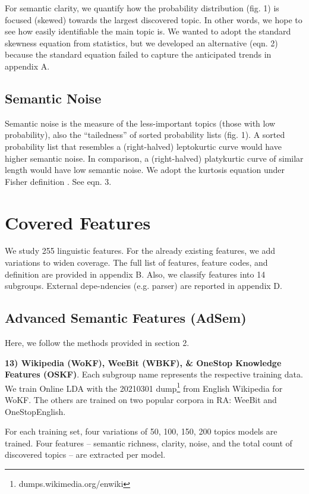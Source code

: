 \documentclass[11pt]{article}
\begin{document}
For semantic clarity, we quantify how the probability distribution (fig. 1) is focused (skewed) towards the largest discovered topic. In other words, we hope to see how easily identifiable the main topic is. We wanted to adopt the standard skewness equation from statistics, but we developed an alternative (eqn. 2) because the standard equation failed to capture the anticipated trends in appendix A.



\subsection{Semantic Noise}
Semantic noise is the measure of the less-important topics (those with low probability), also the ``tailedness'' of sorted probability lists (fig. 1). A sorted probability list that resembles a (right-halved) leptokurtic curve would have higher semantic noise. In comparison, a (right-halved) platykurtic curve of similar length would have low semantic noise. We adopt the kurtosis equation under Fisher definition \citep{kokoska2000crc}. See eqn. 3.



\section{Covered Features}
We study 255 linguistic features. For the already existing features, we add variations to widen coverage. The full list of features, feature codes, and definition are provided in appendix B. Also, we classify features into 14 subgroups. External depe-ndencies (e.g. parser) are reported in appendix D.

\subsection{Advanced Semantic Features (AdSem)}
Here, we follow the methods provided in section 2.

\textbf{13) Wikipedia (WoKF), WeeBit (WBKF), \& OneStop Knowledge Features (OSKF)}. 
Each subgroup name represents the respective training data. We train Online LDA \citep{hoffman2010online} with the 20210301 dump\footnote{dumps.wikimedia.org/enwiki} from English Wikipedia for WoKF. The others are trained on two popular corpora in RA: WeeBit and OneStopEnglish. 

For each training set, four variations of 50, 100, 150, 200 topics models are trained. Four features -- semantic richness, clarity, noise, and the total count of discovered topics -- are extracted per model.
\end{document}
